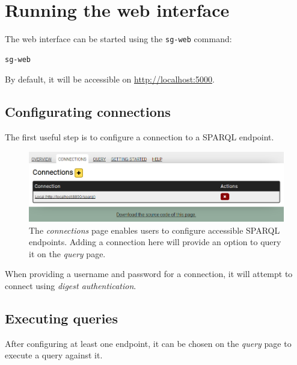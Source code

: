\documentclass[11pt,a4paper,oneside]{book}
\begin{document}
\section{Running the web interface}

  The web interface can be started using the \texttt{sg-web} command:

\begin{siderules}
\begin{verbatim}
sg-web
\end{verbatim}
\end{siderules}

  By default, it will be accessible on \url{http://localhost:5000}.

\subsection{Configurating connections}

  The first useful step is to configure a connection to a SPARQL endpoint.

  \begin{figure}[h]
    \begin{center}
      \includegraphics[width=1.0\textwidth]{figures/web-connections.png}
    \end{center}
    \caption{The \emph{connections} page enables users to configure accessible
      SPARQL endpoints.  Adding a connection here will provide an option to
      query it on the \emph{query} page.}
    \label{fig:web-connections}
  \end{figure}

  When providing a username and password for a connection, it will attempt
  to connect using \emph{digest authentication}.

\subsection{Executing queries}

  After configuring at least one endpoint, it can be chosen on the \emph{query}
  page to execute a query against it.
\end{document}
